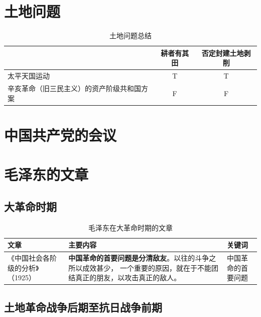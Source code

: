 \documentclass[10pt, UTF8]{book} %
\begin{document}
\section{土地问题}

\begin{table}[H]
    \centering
    \caption{土地问题总结}
    \begin{tabular}{p{} c c}
        \toprule
        & 耕者有其田 & 否定封建土地剥削 \\
        \midrule 
        \hline
        太平天国运动 & T & T \\
        辛亥革命（旧三民主义）的资产阶级共和国方案 & F & F \\
        \bottomrule
    \end{tabular}
\end{table}

\section{中国共产党的会议}

\section{毛泽东的文章}

\subsection{大革命时期}

\begin{table}[H]
    \centering
    \caption{毛泽东在大革命时期的文章}
    \begin{tabular}{p{}|p{}p{}}
        \hline 
        \textbf{文章} & \textbf{主要内容} & \textbf{关键词} \\
        \hline
        《中国社会各阶级的分析》（1925）&
        \textbf{中国革命的首要问题是分清敌友}。以往的斗争之所以成效甚少，
        一个重要的原因，就在于不能团结真正的朋友，以攻击真正的敌人。
        & 中国革命的首要问题 \\ 
        \hline
    \end{tabular}
\end{table}

\subsection{土地革命战争后期至抗日战争前期}
\end{document}
